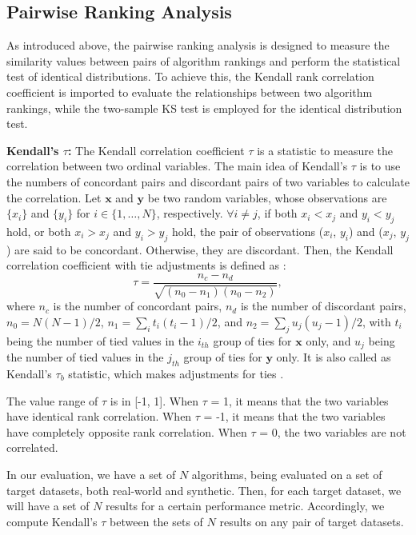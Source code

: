 \documentclass[10pt,twocolumn,letterpaper]{article}
\begin{document}
\subsection{Pairwise Ranking Analysis}

As introduced above, the pairwise ranking analysis is designed to measure the similarity values between pairs of algorithm rankings and perform the statistical test of identical distributions. To achieve this, the Kendall rank correlation coefficient is imported to evaluate the relationships between two algorithm rankings, while the two-sample KS test is employed for the identical distribution test.

\textbf{Kendall's $\tau$:} The Kendall correlation coefficient $\tau$ is a statistic to measure the correlation between two ordinal variables. The main idea of Kendall's $\tau$ is to use the numbers of concordant pairs and discordant pairs of two variables to calculate the correlation. Let $\mathbf{x}$ and $\mathbf{y}$ be two random variables, whose observations are $\{x_i\}$ and $\{y_i\}$ for $i \in \{1,\dots,N\}$, respectively. $\forall i \neq j$, if both $x_i < x_j$ and $y_i < y_j$ hold, or both $x_i > x_j$ and $y_i > y_j$ hold, the pair of observations ($x_i$, $y_i$) and ($x_j$, $y_j$) are said to be concordant. Otherwise, they are discordant. Then, the Kendall correlation coefficient with tie adjustments is defined as \cite{kendall1945}:
\begin{equation}
  \tau = \frac{n_{c} - n_{d}}{\sqrt{(n_0 - n_1 )(n_0 - n_2 )}} ,
\end{equation}
where $n_c$ is the number of concordant pairs, $n_d$ is the number of discordant pairs, \( n_0 = N(N-1)/2 \), \(n_1 = \sum_{i}t_i (t_i -1)/2\), and \( n_2 =\sum_j u_j (u_j -1)/2 \), with $t_i$ being the number of tied values in the $i_{th}$ group of ties for $\mathbf{x}$ only, and $u_j$ being the number of tied values in the $j_{th}$ group of ties for $\mathbf{y}$ only. It is also called as Kendall's $\tau_b$ statistic, which makes adjustments for ties \cite{kendall1945}.

The value range of \(\tau\) is in [-1, 1]. When $\tau$ = 1, it means that the two variables have identical rank correlation. When $\tau$ = -1, it means that the two variables have completely opposite rank correlation. When $\tau$ = 0, the two variables are not correlated.

In our evaluation, we have a set of $N$ algorithms, being evaluated on a set of target datasets, both real-world and synthetic. Then, for each target dataset, we will have a set of $N$ results for a certain performance metric. Accordingly, we compute Kendall's $\tau$ between the sets of $N$ results on any pair of target datasets.
\end{document}
